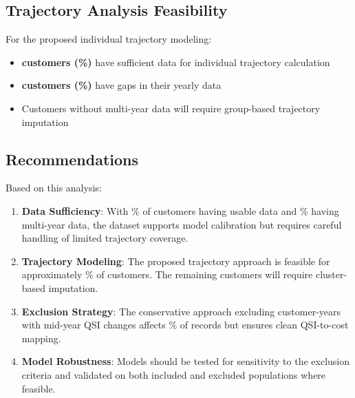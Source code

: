 \subsection{Trajectory Analysis Feasibility}

For the proposed individual trajectory modeling:
\begin{itemize}
    \item \textbf{\CustomersWithTrajectory{} customers (\PctWithTrajectory\%)} have sufficient data for individual trajectory calculation
    \item \textbf{\CustomersWithGaps{} customers (\PctWithGaps\%)} have gaps in their yearly data
    \item Customers without multi-year data will require group-based trajectory imputation
\end{itemize}

\subsection{Recommendations}

Based on this analysis:

\begin{enumerate}
    \item \textbf{Data Sufficiency}: With \CustomerPctOneYear\% of customers having usable data and \CustomerPctTwoPlusYear\% having multi-year data, the dataset supports model calibration but requires careful handling of limited trajectory coverage.
    
    \item \textbf{Trajectory Modeling}: The proposed trajectory approach is feasible for approximately \PctWithTrajectory\% of customers. The remaining customers will require cluster-based imputation.
    
    \item \textbf{Exclusion Strategy}: The conservative approach excluding customer-years with mid-year QSI changes affects \ExclusionMidYearQSIPct\% of records but ensures clean QSI-to-cost mapping.
    
    \item \textbf{Model Robustness}: Models should be tested for sensitivity to the exclusion criteria and validated on both included and excluded populations where feasible.
\end{enumerate}
